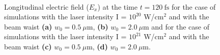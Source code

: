 \begin{figure}[h!]
	\centering
	\\[2mm]
	\caption{Longitudinal electric field ($ E_{x} $) at the time  $ t = 120 \ \mathrm{fs} $ for the case of simulations with the laser intensity I = $ 10^{20} $ W/cm$^2$ and with the beam waist \textbf{(a)} $ w_0 = 0.5 \ \mu\mathrm{m} $, \textbf{(b)} $ w_0 = 2.0 \ \mu\mathrm{m} $ and for the case of simulations with the laser intensity I = $ 10^{21} $ W/cm$^2$ and with the beam waist \textbf{(c)} $ w_0 = 0.5 \ \mu\mathrm{m} $, \textbf{(d)} $ w_0 = 2.0 \ \mu\mathrm{m} $.}
	\label{fig:20}
\end{figure}

